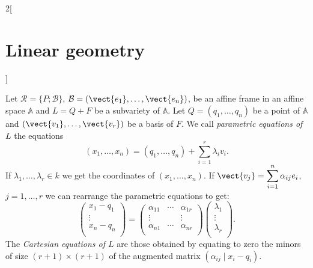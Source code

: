\documentclass[../../../main.tex]{subfiles}
\begin{document}
\begin{multicols}{2}[\section{Linear geometry}]
\begin{definition}
Let $\mathcal{R}=\{P;\mathcal{B}\}$, $\mathcal{B}=(\vect{e_1},\ldots,\vect{e_n})$, be an affine frame in an affine space $\mathbb{A}$ and $L=Q+F$ be a subvariety of $\mathbb{A}$. Let $Q=(q_1,\ldots,q_n)$ be a point of $\mathbb{A}$ and $(\vect{v_1},\ldots,\vect{v_r})$ be a basis of $F$. We call \textit{parametric equations of $L$} the equations $$(x_1,\ldots,x_n)=(q_1,\ldots,q_n)+\sum_{i=1}^r\lambda_iv_i.$$ If $\lambda_1,\ldots,\lambda_r\in k$ we get the coordinates of $(x_1,\ldots,x_n)$. If $\displaystyle \vect{v_j}=\sum_{i=1}^n\alpha_{ij}e_i$, $j=1,\ldots,r$ we can rearrange the parametric equations to get: $$\begin{pmatrix}
x_1-q_1 \\
\vdots \\
x_n-q_n \\
\end{pmatrix}=\begin{pmatrix}
\alpha_{11} & \cdots & \alpha_{1r} \\
\vdots & & \vdots \\
\alpha_{n1} & \cdots & \alpha_{nr} \\
\end{pmatrix}\begin{pmatrix}
\lambda_1 \\
\vdots \\
\lambda_r \\
\end{pmatrix}.$$ The \textit{Cartesian equations of $L$} are those obtained by equating to zero the minors of size $(r+1)\times(r+1)$ of the augmented matrix $\left(\alpha_{ij}\mid x_i-q_i\right)$.
\end{definition}

\end{multicols}
\end{document}
